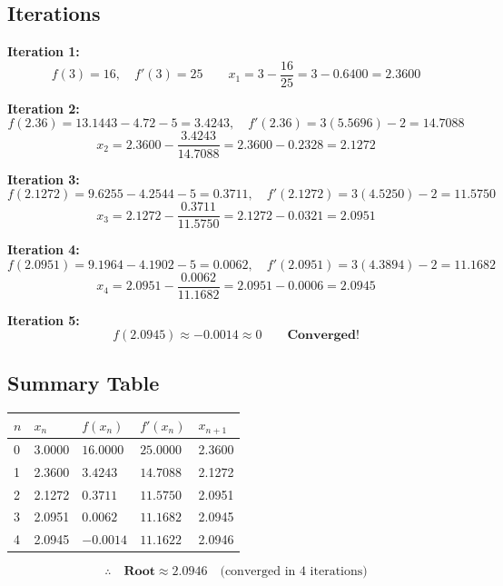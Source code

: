 \documentclass[12pt]{article}
\newcommand{\hcell}[1]{\textbf{\color{white}#1}}
\begin{document}
\vspace{6pt}
\subsection*{Iterations}

\medskip
\noindent\textbf{Iteration 1:}
\[
  f(3) = 16,\quad f'(3) = 25
  \qquad
  x_1 = 3 - \frac{16}{25} = 3 - 0.6400 = \mathbf{2.3600}
\]

\medskip
\noindent\textbf{Iteration 2:}
\[
  f(2.36) = 13.1443-4.72-5 = 3.4243,\quad f'(2.36) = 3(5.5696)-2 = 14.7088
\]
\[
  x_2 = 2.3600 - \frac{3.4243}{14.7088} = 2.3600 - 0.2328 = \mathbf{2.1272}
\]

\medskip
\noindent\textbf{Iteration 3:}
\[
  f(2.1272) = 9.6255-4.2544-5 = 0.3711,\quad f'(2.1272) = 3(4.5250)-2 = 11.5750
\]
\[
  x_3 = 2.1272 - \frac{0.3711}{11.5750} = 2.1272 - 0.0321 = \mathbf{2.0951}
\]

\medskip
\noindent\textbf{Iteration 4:}
\[
  f(2.0951) = 9.1964-4.1902-5 = 0.0062,\quad f'(2.0951) = 3(4.3894)-2 = 11.1682
\]
\[
  x_4 = 2.0951 - \frac{0.0062}{11.1682} = 2.0951 - 0.0006 = \mathbf{2.0945}
\]

\medskip
\noindent\textbf{Iteration 5:}
\[
  f(2.0945) \approx -0.0014 \approx 0 \qquad \textbf{Converged!}
\]

\subsection*{Summary Table}
\begin{center}
\begin{tabular}{C{0.8cm} C{2cm} C{2.2cm} C{2.2cm} C{2cm}}
\toprule
{}
\hcell{$n$} & \hcell{$x_n$} & \hcell{$f(x_n)$} & \hcell{$f'(x_n)$} & \hcell{$x_{n+1}$} \\
\midrule
{}
0 & 3.0000 & $16.0000$ & $25.0000$ & 2.3600 \\
1 & 2.3600 & $3.4243$  & $14.7088$ & 2.1272 \\
2 & 2.1272 & $0.3711$  & $11.5750$ & 2.0951 \\
3 & 2.0951 & $0.0062$  & $11.1682$ & 2.0945 \\
4 & 2.0945 & $-0.0014$ & $11.1622$ & 2.0946 \\
\bottomrule
\end{tabular}
\end{center}
\[
  \therefore\quad \textbf{Root} \approx \mathbf{2.0946} \quad\text{(converged in 4 iterations)}
\]
\end{document}

